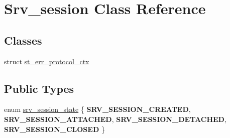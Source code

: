 \hypertarget{classSrv__session}{}\section{Srv\+\_\+session Class Reference}
\label{classSrv__session}
\subsection*{Classes}
\begin{DoxyCompactItemize}
\item 
struct \mbox{\hyperlink{structSrv__session_1_1st__err__protocol__ctx}{st\+\_\+err\+\_\+protocol\+\_\+ctx}}
\end{DoxyCompactItemize}
\subsection*{Public Types}
\begin{DoxyCompactItemize}
\item 
enum \mbox{\hyperlink{classSrv__session_a18b6e470e6fec5df767041054775e0e8}{srv\+\_\+session\+\_\+state}} \{ {\bfseries S\+R\+V\+\_\+\+S\+E\+S\+S\+I\+O\+N\+\_\+\+C\+R\+E\+A\+T\+ED}, 
{\bfseries S\+R\+V\+\_\+\+S\+E\+S\+S\+I\+O\+N\+\_\+\+A\+T\+T\+A\+C\+H\+ED}, 
{\bfseries S\+R\+V\+\_\+\+S\+E\+S\+S\+I\+O\+N\+\_\+\+D\+E\+T\+A\+C\+H\+ED}, 
{\bfseries S\+R\+V\+\_\+\+S\+E\+S\+S\+I\+O\+N\+\_\+\+C\+L\+O\+S\+ED}
 \}
\end{DoxyCompactItemize}
